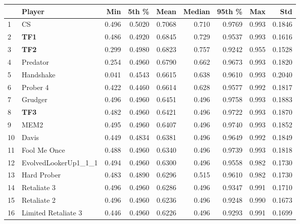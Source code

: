 \begin{tabular}{llrrrrrrr}
\toprule
{} &                Player &    Min &   5th \% &    Mean &  Median &  95th \% &    Max &     Std \\
\midrule
1  &                    CS &  0.496 &  0.5020 &  0.7068 &   0.710 &  0.9769 &  0.993 &  0.1846 \\
2  &                   \textbf{TF1} &  0.486 &  0.4920 &  0.6845 &   0.729 &  0.9537 &  0.993 &  0.1616 \\
3  &                   \textbf{TF2} &  0.299 &  0.4980 &  0.6823 &   0.757 &  0.9242 &  0.955 &  0.1528 \\
4  &              Predator &  0.254 &  0.4960 &  0.6790 &   0.662 &  0.9673 &  0.993 &  0.1820 \\
5  &             Handshake &  0.041 &  0.4543 &  0.6615 &   0.638 &  0.9610 &  0.993 &  0.2040 \\
6  &              Prober 4 &  0.422 &  0.4460 &  0.6614 &   0.628 &  0.9577 &  0.992 &  0.1817 \\
7  &               Grudger &  0.496 &  0.4960 &  0.6451 &   0.496 &  0.9758 &  0.993 &  0.1883 \\
8  &                   \textbf{TF3} &  0.482 &  0.4960 &  0.6421 &   0.496 &  0.9722 &  0.993 &  0.1870 \\
9  &                  MEM2 &  0.495 &  0.4960 &  0.6407 &   0.496 &  0.9740 &  0.993 &  0.1852 \\
10 &                 Davis &  0.449 &  0.4834 &  0.6381 &   0.496 &  0.9649 &  0.992 &  0.1849 \\
11 &          Fool Me Once &  0.488 &  0.4960 &  0.6340 &   0.496 &  0.9739 &  0.993 &  0.1818 \\
12 &  EvolvedLookerUp1\_1\_1 &  0.494 &  0.4960 &  0.6300 &   0.496 &  0.9558 &  0.982 &  0.1730 \\
13 &           Hard Prober &  0.483 &  0.4890 &  0.6296 &   0.515 &  0.9610 &  0.982 &  0.1730 \\
14 &           Retaliate 3 &  0.496 &  0.4960 &  0.6286 &   0.496 &  0.9347 &  0.991 &  0.1710 \\
15 &           Retaliate 2 &  0.496 &  0.4960 &  0.6236 &   0.496 &  0.9248 &  0.990 &  0.1673 \\
16 &   Limited Retaliate 3 &  0.446 &  0.4960 &  0.6226 &   0.496 &  0.9293 &  0.991 &  0.1699 \\
\bottomrule
\end{tabular}
